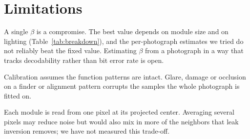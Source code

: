 \section{Limitations}
\label{sec:limitations}

A single $\beta$ is a compromise. The best value depends on module size and on
lighting (Table~\ref{tab:breakdown}), and the per-photograph estimates we tried do not
reliably beat the fixed value. Estimating $\beta$ from a photograph in a way that tracks
decodability rather than bit error rate is open.

Calibration assumes the function patterns are intact. Glare, damage or occlusion on a
finder or alignment pattern corrupts the samples the whole photograph is fitted on.

Each module is read from one pixel at its projected center. Averaging several pixels may
reduce noise but would also mix in more of the neighbors that leak inversion removes; we
have not measured this trade-off.
